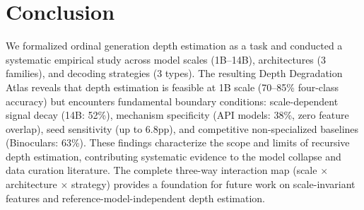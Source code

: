\documentclass[11pt,a4paper]{article}
\begin{document}
\section{Conclusion}

We formalized ordinal generation depth estimation as a task and conducted a systematic empirical study across model scales (1B--14B), architectures (3 families), and decoding strategies (3 types). The resulting Depth Degradation Atlas reveals that depth estimation is feasible at 1B scale (70--85\% four-class accuracy) but encounters fundamental boundary conditions: scale-dependent signal decay (14B: 52\%), mechanism specificity (API models: 38\%, zero feature overlap), seed sensitivity (up to 6.8pp), and competitive non-specialized baselines (Binoculars: 63\%). These findings characterize the scope and limits of recursive depth estimation, contributing systematic evidence to the model collapse and data curation literature. The complete three-way interaction map (scale $\times$ architecture $\times$ strategy) provides a foundation for future work on scale-invariant features and reference-model-independent depth estimation.


\end{document}
